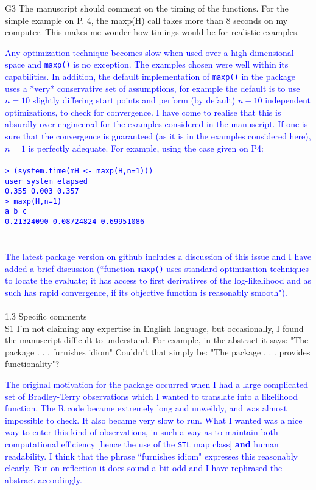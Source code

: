 \documentclass[12pt]{article}
\begin{document}
G3 The manuscript should comment on the timing of the functions. For the
simple example on P. 4, the maxp(H) call takes more than 8 seconds on
my computer. This makes me wonder how timings would be for realistic
examples.

\textcolor{blue}{Any optimization technique becomes slow when used
  over a high-dimensional space and {\tt maxp()} is no exception.  The
  examples chosen were well within its capabilities.  In addition, the
  default implementation of {\tt maxp()} in the package uses a *very*
  conservative set of assumptions, for example the default is to use
  $n=10$ slightly differing start points and perform (by default)
  $n-10$ independent optimizations, to check for
  convergence.  I have come to realise that this is absurdly
  over-engineered for the examples considered in the manuscript.  If
  one is sure that the convergence is guaranteed (as it is in the
  examples considered here), $n=1$ is perfectly adequate.  For
  example, using the case given on P4:
  {\tt\\ \\
> (system.time(mH <- maxp(H,n=1)))\\
   user  system elapsed \\
  0.355   0.003   0.357 \\
> maxp(H,n=1)\\
         a          b          c \\
0.21324090 0.08724824 0.69951086 \\
  }\\ \\
  The latest package version on github includes a discussion of this
  issue and I have added a brief discussion (``function {\tt maxp()}
  uses standard optimization techniques to locate the evaluate; it has
  access to first derivatives of the log-likelihood and as such has
  rapid convergence, if its objective function is reasonably
  smooth").}\\ \\


1.3 Specific comments\\ S1 I'm not claiming any expertise in English
language, but occasionally, I found the manuscript difficult to
understand. For example, in the abstract it says: "The package
. . . furnishes idiom" Couldn't that simply be: "The package
. . . provides functionality"?

\textcolor{blue}{The original motivation for the package occurred when
  I had a large complicated set of Bradley-Terry observations which I
  wanted to translate into a likelihood function.  The R code became
  extremely long and unweildy, and was almost impossible to check.  It
  also became very slow to run.  What I wanted was a nice way to enter
  this kind of observations, in such a way as to maintain both
  computational efficiency [hence the use of the {\tt STL} map class]
  {\bf and} human readability.  I think that the phrase ``furnishes
  idiom" expresses this reasonably clearly.  But on reflection it does
  sound a bit odd and I have rephrased the abstract accordingly.}\\ \\
\end{document}
